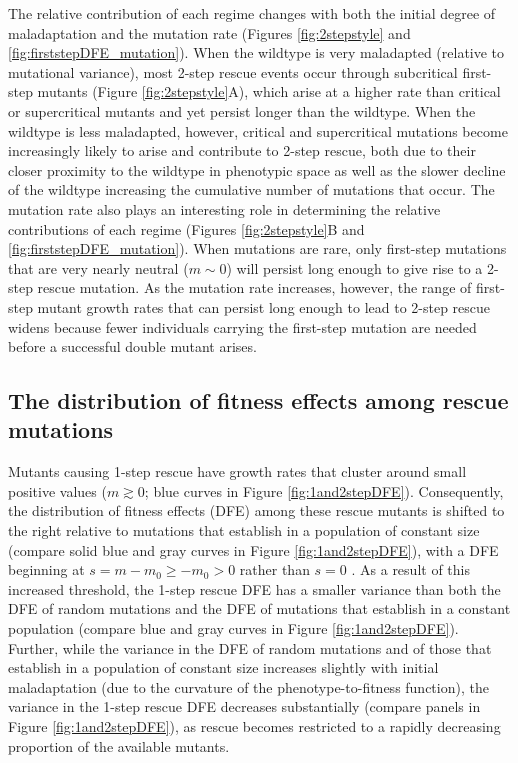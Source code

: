 \documentclass[9pt,twocolumn,twoside,lineno]{gsajnl}
\begin{document}
The relative contribution of each regime changes with both the initial degree of maladaptation and the mutation rate (Figures \ref{fig:2stepstyle} and \ref{fig:firststepDFE_mutation}).
When the wildtype is very maladapted (relative to mutational variance), most 2-step rescue events occur through subcritical first-step mutants (Figure \ref{fig:2stepstyle}A), which arise at a higher rate than critical or supercritical mutants and yet persist longer than the wildtype.
When the wildtype is less maladapted, however, critical and supercritical mutations become increasingly likely to arise and contribute to 2-step rescue, both due to their closer proximity to the wildtype in phenotypic space as well as the slower decline of the wildtype increasing the cumulative number of mutations that occur. 
The mutation rate also plays an interesting role in determining the relative contributions of each regime (Figures \ref{fig:2stepstyle}B and \ref{fig:firststepDFE_mutation}). 
When mutations are rare, only first-step mutations that are very nearly neutral ($m\sim0$) will persist long enough to give rise to a 2-step rescue mutation. 
As the mutation rate increases, however, the range of first-step mutant growth rates that can persist long enough to lead to 2-step rescue widens because fewer individuals carrying the first-step mutation are needed before a successful double mutant arises.

\subsection{The distribution of fitness effects among rescue mutations}

Mutants causing 1-step rescue have growth rates that cluster around small positive values ($m\gtrsim 0$; blue curves in Figure \ref{fig:1and2stepDFE}).
Consequently, the distribution of fitness effects (DFE) among these rescue mutants is shifted to the right relative to mutations that establish in a population of constant size (compare solid blue and gray curves in Figure \ref{fig:1and2stepDFE}), with a DFE beginning at $s = m - m_0 \geq -m_0 > 0$ rather than $s=0$ \citep{Kimura1983}.
As a result of this increased threshold, the 1-step rescue DFE has a smaller variance than both the DFE of random mutations and the DFE of mutations that establish in a constant population (compare blue and gray curves in Figure \ref{fig:1and2stepDFE}). 
Further, while the variance in the DFE of random mutations and of those that establish in a population of constant size increases slightly with initial maladaptation (due to the curvature of the phenotype-to-fitness function), the variance in the 1-step rescue DFE decreases substantially (compare panels in Figure \ref{fig:1and2stepDFE}), as rescue becomes restricted to a rapidly decreasing proportion of the available mutants.
\end{document}
